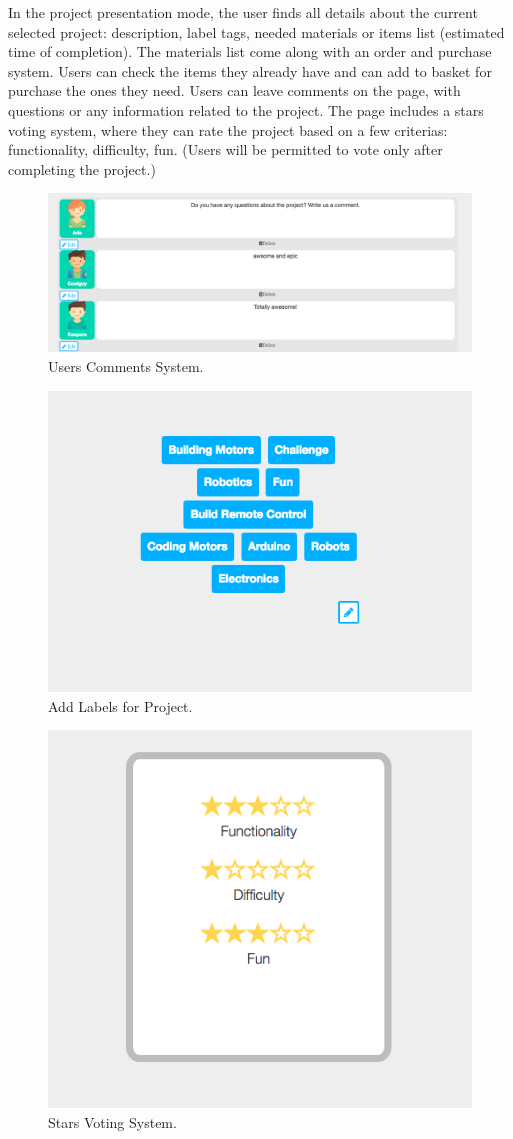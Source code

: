 In the project presentation mode, the user finds all details about the current selected project: description, label tags, needed materials or items list (estimated time of completion). The materials list come along with an order and purchase system. Users can check the items they already have and can add to basket for purchase the ones they need. 
Users can leave comments on the page, with questions or any information related to the project. The page includes a stars voting system, where they can rate the project based on a few criterias: functionality, difficulty, fun. (Users will be permitted to vote only after completing the project.)\\

\begin{figure}
\includegraphics[width=1\linewidth]{images/ui/Comments.png}
\caption{Users Comments System.}
\label{fig:comments}
\end{figure}

\begin{figure}
\includegraphics[width=0.5\linewidth]{images/ui/AddLabels.png}
\caption{Add Labels for Project.}
\label{fig:add_labels}
\end{figure}

\begin{figure}
\includegraphics[width=0.5\linewidth]{images/ui/StarsVotingSystem.png}
\caption{Stars Voting System.}
\label{fig:stars_voting_system}
\end{figure}

